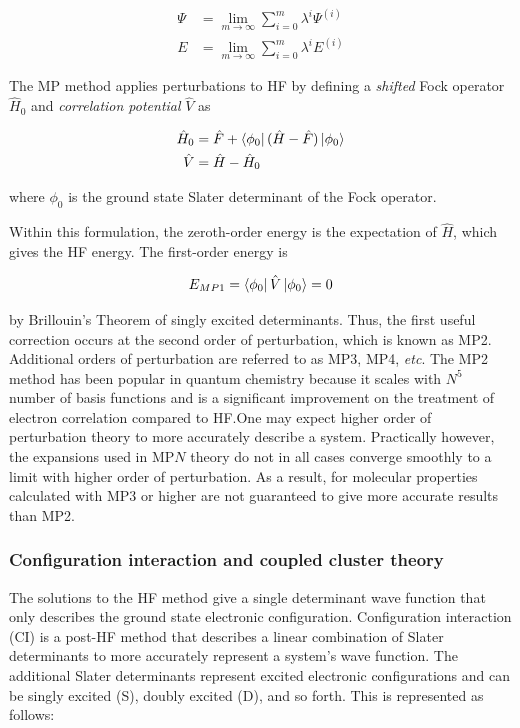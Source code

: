 \begin{doublespace}
\begin{align}
 \Psi &= \lim_{m\to\infty} \sum_{i=0}^{m} \lambda^i \Psi^{(i)} \\
  E &= \lim_{m\to\infty} \sum_{i=0}^{m} \lambda^i E^{(i)}
\end{align}

The MP method applies perturbations to HF by defining a \emph{shifted} Fock
operator $\hat{H}_0$ and \emph{correlation potential} $\hat{V}$ as

\begin{align}
  \hat{H}_0 &= \hat{F} + \bra{\phi_0}(\hat{H}-\hat{F})\ket{\phi_0} \\
  \hat{V}   &= \hat{H} - \hat{H}_0
\end{align}

\noindent where $\phi_0$ is the ground state Slater determinant of the Fock
operator.

Within this formulation, the zeroth-order energy is the expectation of
$\hat{H}$, which gives the HF energy. The first-order energy is

\begin{equation}
  E_{MP1} = \bra{\phi_0}\hat{V}\ket{\phi_0} = 0
\end{equation}

\noindent by Brillouin's Theorem of singly excited determinants. Thus, the first
useful correction occurs at the second order of perturbation, which is known as
MP2. Additional orders of perturbation are referred to as MP3, MP4, \emph{etc}.
The MP2 method has been popular in quantum chemistry because it scales with
$N^5$ number of basis functions and is a significant improvement on the
treatment of electron correlation compared to HF.\@ One may expect higher order
of perturbation theory to more accurately describe a system. Practically
however, the expansions used in MP$N$ theory do not in all cases converge
smoothly to a limit with higher order of perturbation.\cite{Leininger2000} As a
result, for molecular properties calculated with MP3 or higher are not
guaranteed to give more accurate results than MP2.

\subsubsection{Configuration interaction and coupled cluster theory}

The solutions to the HF method give a single determinant wave function that
only describes the ground state electronic configuration. Configuration
interaction (CI) is a post-HF method that describes a linear combination of
Slater determinants to more accurately represent a system's wave function. The
additional Slater determinants represent excited electronic configurations and
can be singly excited (S), doubly excited (D), and so forth. This is
represented as follows:


\end{doublespace}
